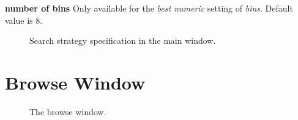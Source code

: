\documentclass{article}
\begin{document}
\textbf{number of bins} Only available for the \emph{best numeric} setting of \emph{bins}.
Default value is \emph{$8$}.

\begin{figure}
\begin{center}
\centering
{}
\caption{Search strategy specification in the main window.}
\end{center}
\label{fig:searchstrategy}
\end{figure}






\section{Browse Window}
\label{section:browse-window}

\begin{figure}
\begin{center}
\centering
{}
\caption{The browse window.}
\end{center}
\label{fig:browsewindow}
\end{figure}
\end{document}
